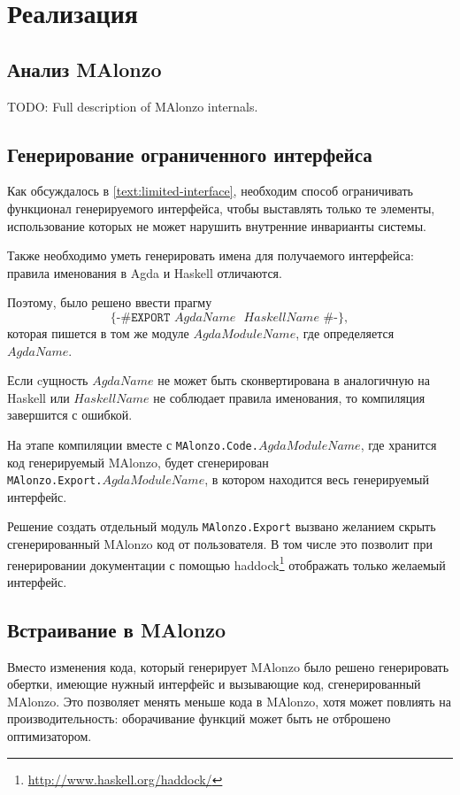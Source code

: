 \section{Реализация}

\subsection{Анализ MAlonzo}

TODO: Full description of MAlonzo internals.

\subsection{Генерирование ограниченного интерфейса}

Как обсуждалось в \ref{text:limited-interface}, необходим способ ограничивать
функционал генерируемого интерфейса, чтобы выставлять только те элементы,
использование которых не может нарушить внутренние инварианты системы.

Также необходимо уметь генерировать имена для получаемого интерфейса:
правила именования в Agda и Haskell отличаются.

Поэтому, было решено ввести прагму
\[
\texttt{\{-\# EXPORT \(AgdaName\) \(HaskellName\) \#-\}},
\]
которая пишется в том же модуле \(AgdaModuleName\), где определяется \\\(AgdaName\).

Если cущность \(AgdaName\) не может быть сконвертирована в аналогичную на Haskell
или \(HaskellName\) не соблюдает правила именования, то компиляция завершится с ошибкой.

На этапе компиляции вместе с \texttt{MAlonzo.Code.\(AgdaModuleName\)}, где хранится
код генерируемый MAlonzo, будет сгенерирован \\\texttt{MAlonzo.Export.\(AgdaModuleName\)},
в котором находится весь генерируемый интерфейс.

Решение создать отдельный модуль \texttt{MAlonzo.Export} вызвано желанием скрыть
сгенерированный MAlonzo код от пользователя. В том числе это позволит
при генерировании документации с помощью
haddock\footnote{\url{http://www.haskell.org/haddock/}} отображать только желаемый
интерфейс.

\subsection{Встраивание в MAlonzo}

Вместо изменения кода, который генерирует MAlonzo было решено генерировать
обертки, имеющие нужный интерфейс и вызывающие код, сгенерированный MAlonzo.
Это позволяет менять меньше кода в MAlonzo, хотя может повлиять на производительность:
оборачивание функций может быть не отброшено оптимизатором.


